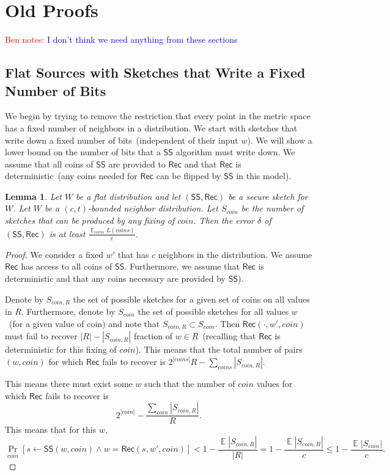 \documentclass[11pt]{article}
\DeclareMathOperator*{\expe}{\mathbb{E}}
\newcommand{\class}[1]{{\ensuremath{\mathsf{#1}}}}
\newcommand{\sketch}{\ensuremath{\class{SS}}\xspace}
\newcommand{\rec}{\ensuremath{\class{Rec}}\xspace}
\newtheorem{lemma}[theorem]{Lemma}
\newcommand{\authnote}[2]{{\textcolor{red}{\textsf{#1 notes: }\textcolor{blue}{ #2}}\marginpar{\textcolor{red}{\textbf{!!!!!}}}}}
\newcommand{\authnote}[2]{}
\newcommand{\bnote}[1]{{\authnote{Ben}{#1}}}
\begin{document}
\section{Old Proofs}
\bnote{I don't think we need anything from these sections}
\subsection{Flat Sources with Sketches that Write a Fixed Number of Bits}
We begin by trying to remove the restriction that every point in the metric space has a fixed number of neighbors in a distribution.  We start with sketches that write down a fixed number of bits~(independent of their input $w$).   We will show a lower bound on the number of bits that a $\sketch$ algorithm must write down.  We assume that all coins of $\sketch$ are provided to $\rec$ and that $\rec$ is deterministic~(any coins needed for $\rec$ can be flipped by $\sketch$ in this model).

\begin{lemma}
Let $W$ be a flat distribution and let $(\sketch, \rec)$ be a secure sketch for $W$.  Let $W$ be a $(c, t)$-bounded neighbor distribution.  Let $S_{coin}$ be the number of sketches that can be produced by any fixing of $coin$.  Then the error $\delta$ of $(\sketch, \rec)$ is at least $\frac{\expe_{coins}L(coins)}{c}$.  
\end{lemma}
\begin{proof}
We consider a fixed $w'$ that has $c$ neighbors in the distribution.  We assume $\rec$ has access to all coins of $\sketch$.  Furthermore, we assume that $\rec$ is deterministic and that any coins necessary are provided by $\sketch$).  

Denote by $S_{coin, R}$ the set of possible sketches for a given set of coins on all values in $R$.  Furthermore, denote by $S_{coin}$ the set of possible sketches for all values $w$~(for a given value of coin) and note that $S_{coin, R} \subset S_{coin}$.  Then $\rec(\cdot, w', coin)$ must fail to recover $|R|-|S_{coin, R}|$ fraction of $w\in R$~(recalling that $\rec$ is deterministic for this fixing of $coin$).  This means that the total number of pairs $(w, coin)$ for which $\rec$ fails to recover is $2^{|coins|}R - \sum_{coins} |S_{coin, R}|$.

This means there must exist some $w$ such that the number of $coin$ values for which $\rec$ fails to recover is 
\[
2^{|coin|} - \frac{\sum_{coin} |S_{coin, R}|}{R}.
\]
 This means that for this $w$, 
\[
\Pr_{coin}[s \leftarrow \sketch(w, coin) \wedge w = \rec(s, w', coin)] < 1- \frac{\expe |S_{coin, R}|}{|R|} = 1-\frac{\expe |S_{coin, R}|}{c} \le 1-\frac{\expe |S_{coin}| }{c}.
\]

\end{proof}
\end{document}
